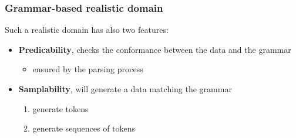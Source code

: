 \documentclass[9pt]{beamer}
\begin{document}
\begin{frame}
\frametitle{Grammar-based realistic domain}

Such a realistic domain has also two features:
\begin{itemize}
\item[\checked] \textbf{Predicability}, checks the conformance between the
data and the grammar
  \begin{itemize}
  \item ensured by the parsing process
  \end{itemize}
\item[\Square] \textbf{Samplability}, will generate a data matching the grammar
  \begin{enumerate}
  \item generate tokens
  \item generate sequences of tokens
  \end{enumerate}
\end{itemize}

\end{frame}
\end{document}
